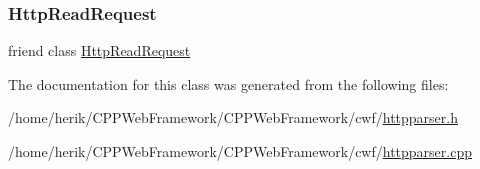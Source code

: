 \subsubsection{\texorpdfstring{Http\+Read\+Request}{HttpReadRequest}}
{\footnotesize\ttfamily friend class \hyperlink{class_http_read_request}{Http\+Read\+Request}\hspace{0.3cm}{\ttfamily [friend]}}



The documentation for this class was generated from the following files\+:\begin{DoxyCompactItemize}
\item 
/home/herik/\+C\+P\+P\+Web\+Framework/\+C\+P\+P\+Web\+Framework/cwf/\hyperlink{httpparser_8h}{httpparser.\+h}\item 
/home/herik/\+C\+P\+P\+Web\+Framework/\+C\+P\+P\+Web\+Framework/cwf/\hyperlink{httpparser_8cpp}{httpparser.\+cpp}\end{DoxyCompactItemize}
